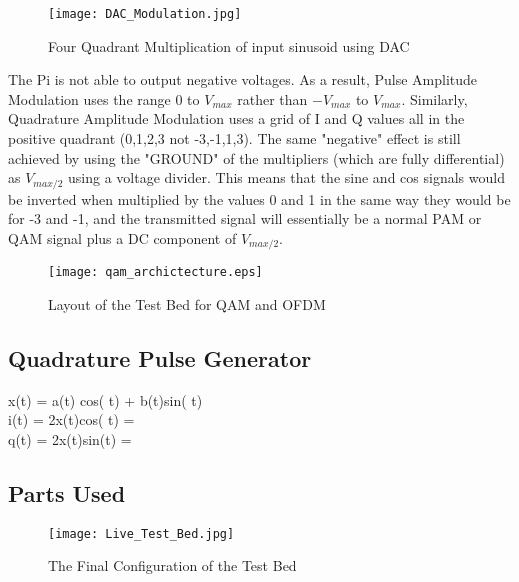 \documentclass[../main.tex]{subfiles}
\begin{document}
\begin{figure}[ht]
	\centering
	\texttt{[image: DAC\_Modulation.jpg]}
	\caption{Four Quadrant Multiplication of input sinusoid using DAC}
	\label{fig_}
\end{figure}

The Pi is not able to output negative voltages.
As a result, Pulse Amplitude Modulation uses the range $0$ to $V_{max}$ rather than $-V_{max}$ to $V_{max}$.
Similarly, Quadrature Amplitude Modulation uses a grid of I and Q values all in the positive quadrant (0,1,2,3 not -3,-1,1,3).
The same "negative" effect is still achieved by using the "GROUND" of the multipliers (which are fully differential)
as $V_{max/2}$ using a voltage divider.
This means that the sine and cos signals would be inverted when multiplied by the values 0 and 1 in the same way they would be for -3 and -1, and the transmitted signal will essentially be a normal PAM or QAM signal plus a DC component of $V_{max/2}$.

\begin{figure}[ht]
	\centering
	\texttt{[image: qam\_archictecture.eps]}
	\caption{Layout of the Test Bed for QAM and OFDM}
	\label{fig_QAM Layout}
\end{figure}

\subsection{Quadrature Pulse Generator}

x(t) = a(t) cos( t) + b(t)sin( t)\\
i(t) = 2x(t)cos( t) = \\
q(t) = 2x(t)sin(t) = 

\subsection{Parts Used}

\begin{figure}[ht]
	\centering
	\texttt{[image: Live\_Test\_Bed.jpg]}
	\caption{The Final Configuration of the Test Bed}
\end{figure}

\end{document}
